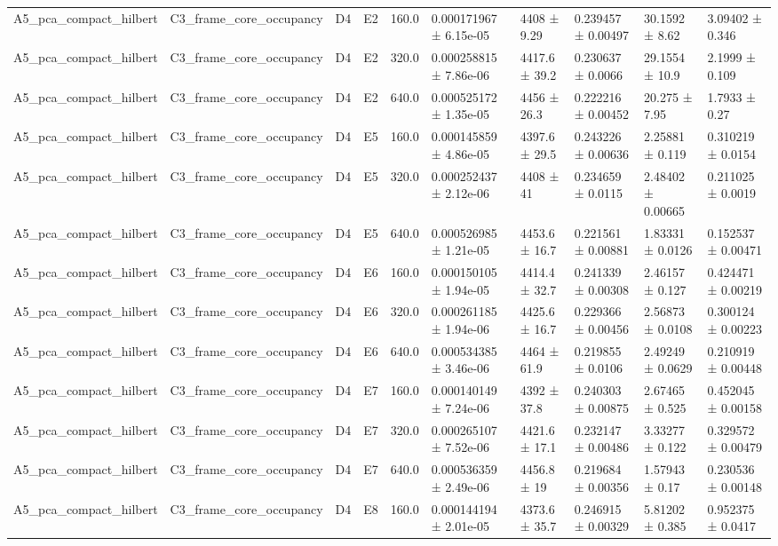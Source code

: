 \begin{table}
\begin{tabular}{llllllllll}
A5\_pca\_compact\_hilbert & C3\_frame\_core\_occupancy & D4 & E2 & 160.0 & 0.000171967 ± 6.15e-05 & 4408 ± 9.29 & 0.239457 ± 0.00497 & 30.1592 ± 8.62 & 3.09402 ± 0.346 \\
A5\_pca\_compact\_hilbert & C3\_frame\_core\_occupancy & D4 & E2 & 320.0 & 0.000258815 ± 7.86e-06 & 4417.6 ± 39.2 & 0.230637 ± 0.0066 & 29.1554 ± 10.9 & 2.1999 ± 0.109 \\
A5\_pca\_compact\_hilbert & C3\_frame\_core\_occupancy & D4 & E2 & 640.0 & 0.000525172 ± 1.35e-05 & 4456 ± 26.3 & 0.222216 ± 0.00452 & 20.275 ± 7.95 & 1.7933 ± 0.27 \\
A5\_pca\_compact\_hilbert & C3\_frame\_core\_occupancy & D4 & E5 & 160.0 & 0.000145859 ± 4.86e-05 & 4397.6 ± 29.5 & 0.243226 ± 0.00636 & 2.25881 ± 0.119 & 0.310219 ± 0.0154 \\
A5\_pca\_compact\_hilbert & C3\_frame\_core\_occupancy & D4 & E5 & 320.0 & 0.000252437 ± 2.12e-06 & 4408 ± 41 & 0.234659 ± 0.0115 & 2.48402 ± 0.00665 & 0.211025 ± 0.0019 \\
A5\_pca\_compact\_hilbert & C3\_frame\_core\_occupancy & D4 & E5 & 640.0 & 0.000526985 ± 1.21e-05 & 4453.6 ± 16.7 & 0.221561 ± 0.00881 & 1.83331 ± 0.0126 & 0.152537 ± 0.00471 \\
A5\_pca\_compact\_hilbert & C3\_frame\_core\_occupancy & D4 & E6 & 160.0 & 0.000150105 ± 1.94e-05 & 4414.4 ± 32.7 & 0.241339 ± 0.00308 & 2.46157 ± 0.127 & 0.424471 ± 0.00219 \\
A5\_pca\_compact\_hilbert & C3\_frame\_core\_occupancy & D4 & E6 & 320.0 & 0.000261185 ± 1.94e-06 & 4425.6 ± 16.7 & 0.229366 ± 0.00456 & 2.56873 ± 0.0108 & 0.300124 ± 0.00223 \\
A5\_pca\_compact\_hilbert & C3\_frame\_core\_occupancy & D4 & E6 & 640.0 & 0.000534385 ± 3.46e-06 & 4464 ± 61.9 & 0.219855 ± 0.0106 & 2.49249 ± 0.0629 & 0.210919 ± 0.00448 \\
A5\_pca\_compact\_hilbert & C3\_frame\_core\_occupancy & D4 & E7 & 160.0 & 0.000140149 ± 7.24e-06 & 4392 ± 37.8 & 0.240303 ± 0.00875 & 2.67465 ± 0.525 & 0.452045 ± 0.00158 \\
A5\_pca\_compact\_hilbert & C3\_frame\_core\_occupancy & D4 & E7 & 320.0 & 0.000265107 ± 7.52e-06 & 4421.6 ± 17.1 & 0.232147 ± 0.00486 & 3.33277 ± 0.122 & 0.329572 ± 0.00479 \\
A5\_pca\_compact\_hilbert & C3\_frame\_core\_occupancy & D4 & E7 & 640.0 & 0.000536359 ± 2.49e-06 & 4456.8 ± 19 & 0.219684 ± 0.00356 & 1.57943 ± 0.17 & 0.230536 ± 0.00148 \\
A5\_pca\_compact\_hilbert & C3\_frame\_core\_occupancy & D4 & E8 & 160.0 & 0.000144194 ± 2.01e-05 & 4373.6 ± 35.7 & 0.246915 ± 0.00329 & 5.81202 ± 0.385 & 0.952375 ± 0.0417 \\

\end{tabular}
\end{table}
